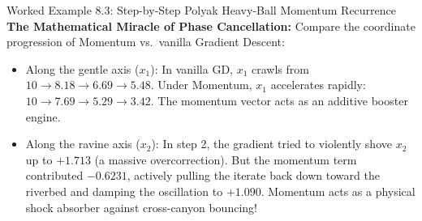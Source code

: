 \begin{examplebox}[breakable]{Worked Example 8.3: Step-by-Step Polyak Heavy-Ball Momentum Recurrence}
\textbf{The Mathematical Miracle of Phase Cancellation:}
Compare the coordinate progression of Momentum vs.\ vanilla Gradient Descent:
\begin{itemize}
    \item Along the gentle axis ($x_1$): In vanilla GD, $x_1$ crawls from $10 \to 8.18 \to 6.69 \to 5.48$. Under Momentum, $x_1$ accelerates rapidly: $10 \to 7.69 \to 5.29 \to 3.42$. The momentum vector acts as an additive booster engine.
    \item Along the ravine axis ($x_2$): In step 2, the gradient tried to violently shove $x_2$ up to $+1.713$ (a massive overcorrection). But the momentum term contributed $-0.6231$, actively pulling the iterate back down toward the riverbed and damping the oscillation to $+1.090$. Momentum acts as a physical shock absorber against cross-canyon bouncing!
\end{itemize}
\end{examplebox}

